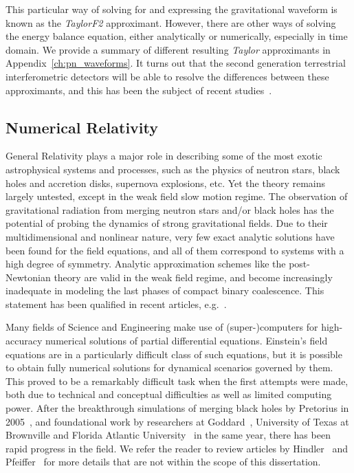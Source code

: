 
This particular way of solving for and expressing the gravitational waveform 
is known as the {\it TaylorF2} approximant. However, there are other ways
of solving the energy balance equation, either analytically or numerically,
especially in time domain. We provide a summary of different resulting 
{\it Taylor} approximants in Appendix~\ref{ch:pn_waveforms}. It turns out 
that the second generation terrestrial interferometric detectors will be 
able to resolve the differences between these approximants, and this has been 
the subject of recent studies~\cite{Buonanno:2009zt,NRPNComparisonBoyleetal}.

\subsection{Numerical Relativity}
\label{sec:NRWaveforms}

General Relativity plays a major role in describing some of the most exotic 
astrophysical systems and processes, such as the physics of neutron stars, 
black holes and accretion disks, supernova explosions, etc. Yet the theory 
remains largely untested, except in the weak field slow motion regime. 
The observation of gravitational radiation from merging neutron stars and/or
black holes has the potential of probing the dynamics of strong gravitational
fields.
Due to their multidimensional and nonlinear nature, 
very few exact analytic solutions have been found for the field equations, 
and all of them correspond to systems with a high degree of symmetry.
Analytic approximation schemes like the post-Newtonian theory are valid in
the weak field regime, and become increasingly inadequate in 
modeling the last phases of compact binary coalescence. 
This statement has been qualified in recent articles, e.g.~\cite{Nitz:2013mxa}.

Many fields of Science and Engineering make use of (super-)computers for 
high-accuracy numerical solutions of partial differential equations. 
Einstein's field equations are in a particularly difficult class of such
equations, but it is possible to obtain fully numerical solutions for dynamical
scenarios governed by them. This proved to be a remarkably difficult task
when the first attempts were made, both due to technical and conceptual 
difficulties as well as limited computing power. After the breakthrough
simulations of merging black holes by Pretorius in 
2005~\cite{Pretorius2005}, and foundational work by researchers at 
Goddard~\cite{Campanelli:2005dd}, University of Texas at Brownville and Florida
Atlantic University~\cite{Campanelli:2005dd} in the same year, there has been
rapid progress in the field. 
We refer the reader to review articles by Hindler~\cite{Hinder:2010vn} and
Pfeiffer~\cite{Pfeiffer:2012pc} for more details that are not 
within the scope of this dissertation. 

